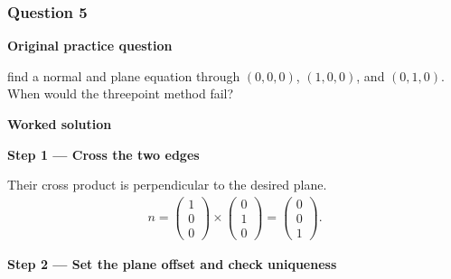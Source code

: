 \documentclass[letterpaper,11pt,english,openany,oneside]{jupyterBook}
\begin{document}
\subsubsection{Question 5}
\label{\detokenize{lectures/lecture01/tldr:question-5}}\label{\detokenize{lectures/lecture01/tldr:lec01-tldr-q5}}
\par\medskip\textbf{Original practice question}\par\smallskip

\sphinxAtStartPar
{} find a normal and plane equation through \((0,0,0)\), \((1,0,0)\), and \((0,1,0)\). When would the three\sphinxhyphen{}point method fail?

\par\medskip

\par\medskip
\textbf{Worked solution}\par\smallskip

\par\medskip{}
{\color{QuizStepRed}\bfseries Step 1 — Cross the two edges}\par\smallskip

\sphinxAtStartPar
{} Their cross product is perpendicular to the desired plane.
{\color{QuizMathBlue} \begin{equation*}
\begin{split}
n=\begin{pmatrix}1\\0\\0\end{pmatrix}\times\begin{pmatrix}0\\1\\0\end{pmatrix}=\begin{pmatrix}0\\0\\1\end{pmatrix}.
\end{split}
\end{equation*}}
\par

\par\medskip{}
{\color{QuizStepRed}\bfseries Step 2 — Set the plane offset and check uniqueness}\par\smallskip
\end{document}
